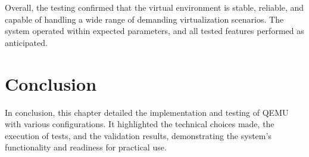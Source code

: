 Overall, the testing confirmed that the virtual environment is stable, reliable, and capable of handling a wide range of demanding virtualization scenarios. The system operated within expected parameters, and all tested features performed as anticipated.

\section{Conclusion}
In conclusion, this chapter detailed the implementation and testing of QEMU with various configurations. It highlighted the technical choices made, the execution of tests, and the validation results, demonstrating the system’s functionality and readiness for practical use.
